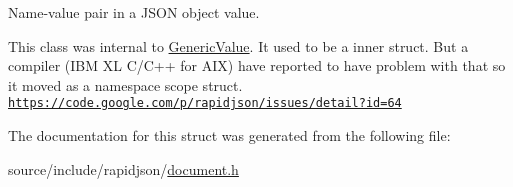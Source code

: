 Name-\/value pair in a J\+S\+O\+N object value. 

This class was internal to \hyperlink{class_generic_value}{Generic\+Value}. It used to be a inner struct. But a compiler (I\+B\+M X\+L C/\+C++ for A\+I\+X) have reported to have problem with that so it moved as a namespace scope struct. \href{https://code.google.com/p/rapidjson/issues/detail?id=64}{\tt https\+://code.\+google.\+com/p/rapidjson/issues/detail?id=64} 

The documentation for this struct was generated from the following file\+:\begin{DoxyCompactItemize}
\item 
source/include/rapidjson/\hyperlink{document_8h}{document.\+h}\end{DoxyCompactItemize}
